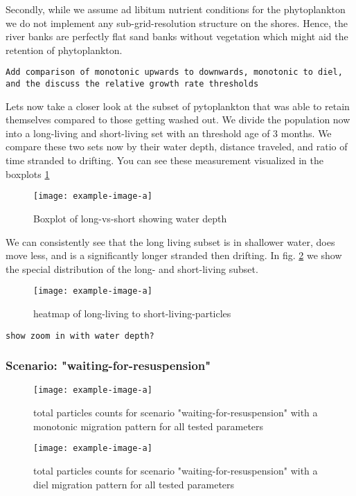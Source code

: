 Secondly, while we assume ad libitum nutrient conditions for the phytoplankton we do not implement any sub-grid-resolution structure on the shores.
Hence, the river banks are perfectly flat sand banks without vegetation which might aid the retention of phytoplankton.

\texttt{Add comparison of monotonic upwards to downwards, monotonic to diel, and the discuss the relative growth rate thresholds}

Lets now take a closer look at the subset of pytoplankton that was able to retain themselves compared to those getting washed out.
We divide the population now into a long-living and short-living set with an threshold age of 3 months.
We compare these two sets now by their water depth, distance traveled, and ratio of time stranded to drifting.
You can see these measurement visualized in the boxplots \ref{fig:migration-long-vs-short}

\begin{figure}
    \texttt{[image: example-image-a]}
    \caption[]{Boxplot of long-vs-short showing water depth}
    \label{fig:migration-long-vs-short}
\end{figure}

We can consistently see that the long living subset is in shallower water, does move less, and is a significantly longer stranded then drifting.
In fig. \ref{fig:migration-long-vs-short-heatmap} we show the special distribution of the long- and short-living subset.

\begin{figure}
    \texttt{[image: example-image-a]}
    \caption[]{heatmap of long-living to short-living-particles}
    \label{fig:migration-long-vs-short-heatmap}
\end{figure}

\texttt{show zoom in with water depth?}

\subsubsection*{Scenario: "waiting-for-resuspension"}

\begin{figure}
    \texttt{[image: example-image-a]}
    \caption[]{total particles counts for scenario "waiting-for-resuspension" with a monotonic migration pattern for all tested parameters}
    \label{fig:stranded-monotonic-particle-counts}
\end{figure}
\begin{figure}
    \texttt{[image: example-image-a]}
    \caption[]{total particles counts for scenario "waiting-for-resuspension" with a diel migration pattern for all tested parameters}
    \label{fig:stranded-diel-particle-counts}
\end{figure}

